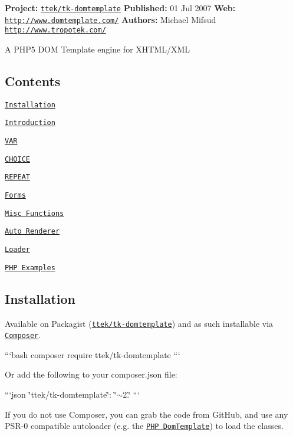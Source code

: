 {\bfseries Project\+:} \href{http://packagist.org/packages/ttek/tk-domtemplate}{\tt ttek/tk-\/domtemplate} {\bfseries Published\+:} 01 Jul 2007 {\bfseries Web\+:} \href{http://www.domtemplate.com/}{\tt http\+://www.\+domtemplate.\+com/} {\bfseries Authors\+:} Michael Mifsud \href{http://www.tropotek.com/}{\tt http\+://www.\+tropotek.\+com/}

A P\+H\+P5 D\+O\+M Template engine for X\+H\+T\+M\+L/\+X\+M\+L

\subsection*{Contents}


\begin{DoxyItemize}
\item \href{#installation}{\tt Installation}
\item \href{#introduction}{\tt Introduction}
\item \href{#var}{\tt V\+A\+R}
\item \href{#choice}{\tt C\+H\+O\+I\+C\+E}
\item \href{#repeat}{\tt R\+E\+P\+E\+A\+T}
\item \href{#form}{\tt Forms}
\item \href{#misc-functions}{\tt Misc Functions}
\item \href{#autorenderer}{\tt Auto Renderer}
\item \href{#loader}{\tt Loader}
\item \href{docs/examples/}{\tt P\+H\+P Examples}
\end{DoxyItemize}

\subsection*{Installation}

Available on Packagist (\href{http://packagist.org/packages/ttek/tk-domtemplate}{\tt ttek/tk-\/domtemplate}) and as such installable via \href{http://getcomposer.org/}{\tt Composer}.

```bash composer require ttek/tk-\/domtemplate ```

Or add the following to your composer.\+json file\+:

```json \char`\"{}ttek/tk-\/domtemplate\char`\"{}\+: \char`\"{}$\sim$2.\char`\"{} ```

If you do not use Composer, you can grab the code from Git\+Hub, and use any P\+S\+R-\/0 compatible autoloader (e.\+g. the \href{https://github.com/tropotek/tk-domtemplate}{\tt P\+H\+P Dom\+Template}) to load the classes.

